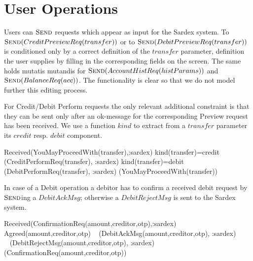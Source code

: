 \section{User Operations}
\label{sect:userops}

Users can $\hbox{\sc Send}$ requests which appear as input for the Sardex system. To $\hbox{\sc Send}(CreditPreviewReq(transfer))$ or to $\hbox{\sc Send}(DebitPreviewReq(transfer))$ is conditioned only by a correct definition of the $transfer$ parameter, definition the user supplies by filling in the corresponding  fields on the screen. The same holds mutatis mutandis for $\hbox{\sc Send}(AccountHistReq(histParams))$ and $\hbox{\sc Send}(BalanceReq(acc))$. The functionality is clear so that we do not model further this editing process.

For Credit/Debit Perform requests the only relevant additional constraint is that they can be sent only after an ok-message for the corresponding Preview request has been received. We use a function $kind$ to extract from a $transfer$ parameter its $credit$ resp. $debit$ component.

\begin{asm}
\IF Received(YouMayProceedWith(transfer),\FROM :sardex) \THEN \+
\IF kind(transfer)=credit \THEN \+
   (CreditPerformReq(transfer), \TO :sardex) \-
\IF kind(transfer)=debit \THEN \+
   (DebitPerformReq(transfer), \TO :sardex)  \-
(YouMayProceedWith(transfer))
\end{asm}

In case of a Debit operation a debitor has to confirm a received debit request by $\hbox{\sc Send}$ing a $DebitAckMsg$; otherwise a $DebitRejectMsg$ is sent to the Sardex system.
\begin{asm}
\IF Received(ConfirmationReq(amount,creditor,otp),\FROM :sardex) \THEN \+
   \IF Agreed(amount,creditor,otp)\+
       \THEN ~ (DebitAckMsg(amount,creditor,otp), \TO :sardex) \\
       \ELSE ~ (DebitRejectMsg(amount,creditor,otp), \TO :sardex)\-
   (ConfirmationReq(amount,creditor,otp))
\end{asm}

 


















